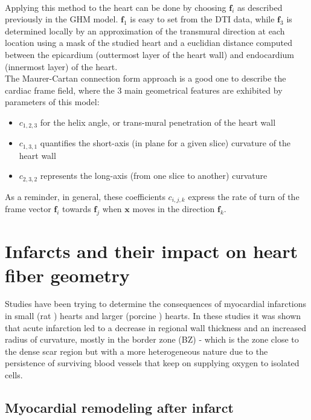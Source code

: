 \\
Applying this method to the heart can be done by choosing $\mathbf{f}_i$ as described previously in the GHM model. $\mathbf{f}_1$ is easy to set from the DTI data, while $\mathbf{f}_3$ is determined locally by an approximation of the transmural direction at each location using a mask of the studied heart and a euclidian distance computed between the epicardium (outtermost layer of the heart wall) and endocardium (innermost layer) of the heart.\\
The Maurer-Cartan connection form approach is a good one to describe the cardiac frame field, where the 3 main geometrical features are exhibited by parameters of this model:
\begin{itemize}
    \item $c_{1,2,3}$ for the helix angle, or trans-mural penetration of the heart wall
    \item $c_{1,3,1}$ quantifies the short-axis (in plane for a given slice) curvature of the heart wall
    \item $c_{2,3,2}$ represents the long-axis (from one slice to another) curvature
\end{itemize}
As a reminder, in general, these coefficients $c_{i,j,k}$ express the rate of turn of the frame vector $\mathbf{f}_i$ towards $\mathbf{f}_j$ when $\mathbf{x}$ moves in the direction $\mathbf{f}_k$.

\section{Infarcts and their impact on heart fiber geometry}

Studies have been trying to determine the consequences of myocardial infarctions in small (rat \cite{weisman1985global}) hearts and larger (porcine \cite{wu2007mr, mediamihaela}) hearts. In these studies it was shown that acute infarction led to a decrease in regional wall thickness and an increased radius of curvature, mostly in the border zone (BZ) - which is the zone close to the dense scar region but with a more heterogeneous nature due to the persistence of surviving blood vessels that keep on supplying oxygen to isolated cells.

\subsection{Myocardial remodeling after infarct}


